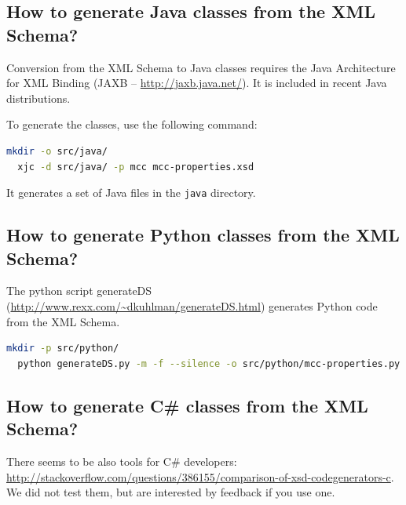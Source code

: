 \documentclass[10pt,english,a4paper]{article}
\newcommand\eqdef            {\mathrel{:=}}
\newcommand\set[1]           {{\{ #1 \mathclose \}}}
\newcommand\N                {\mathbb{N}}
\newcommand\mysection[1]{\color{sectioncolor}\section{#1}\color{defaultcolor}}
\newcommand\mysubsection[1]{\color{sectioncolor}\subsection{#1}\color{defaultcolor}}
\begin{document}
\mysubsection{How to generate Java classes from the XML Schema?}
Conversion from the XML Schema to Java classes requires the Java Architecture for XML Binding
(JAXB -- \url{http://jaxb.java.net/}).
It is included in recent Java distributions.

To generate the classes, use the following command:
\begin{lstlisting}[language=sh]
  mkdir -o src/java/
  xjc -d src/java/ -p mcc mcc-properties.xsd
\end{lstlisting}
It generates a set of Java files in the \lstinline!java! directory.

\mysubsection{How to generate Python classes from the XML Schema?}
The python script generateDS (\url{http://www.rexx.com/~dkuhlman/generateDS.html}) generates Python code from the XML Schema.

\begin{lstlisting}[language=sh]
  mkdir -p src/python/
  python generateDS.py -m -f --silence -o src/python/mcc-properties.py mcc-properties.xsd
\end{lstlisting}

\mysubsection{How to generate C\# classes from the XML Schema?}
There seems to be also tools for C\# developers: \\
\url{http://stackoverflow.com/questions/386155/comparison-of-xsd-codegenerators-c}.
We did not test them, but are interested by feedback if you use one.
\fi





\end{document}
